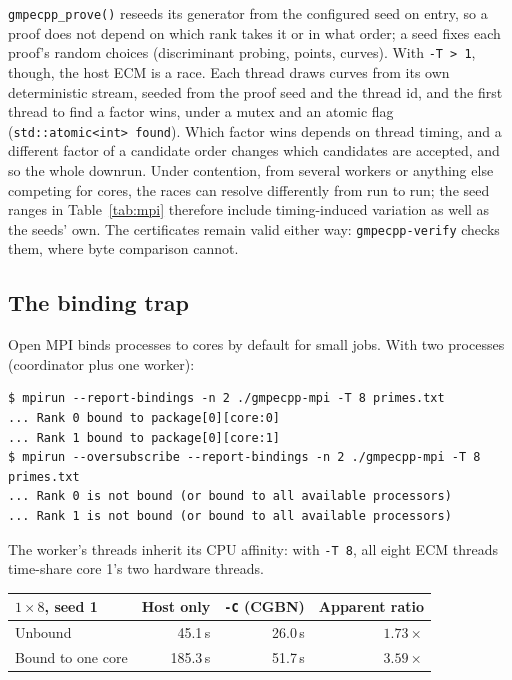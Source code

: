 \documentclass[11pt,a4paper]{article}
\newcommand{\code}[1]{\texttt{#1}}
\begin{document}
\code{gmpecpp\_prove()} reseeds its generator from the configured seed on
entry, so a proof does not depend on which rank takes it or in what order;
a seed fixes each proof's random choices (discriminant probing, points,
curves). With \code{-T > 1}, though, the host ECM is a race. Each thread
draws curves from its own deterministic stream, seeded from the proof seed
and the thread id, and the first thread to find a factor wins, under a
mutex and an atomic flag (\code{std::atomic<int> found}). Which factor wins
depends on thread timing, and a different factor of a candidate order
changes which candidates are accepted, and so the whole downrun. Under
contention, from several workers or anything else competing for cores, the
races can resolve differently from run to run; the seed ranges in
Table~\ref{tab:mpi} therefore include timing-induced variation as well as
the seeds' own. The certificates remain valid either way:
\code{gmpecpp-verify} checks them, where byte comparison cannot.

\subsection{The binding trap}
\label{sec:binding}

Open MPI binds processes to cores by default for small jobs. With two
processes (coordinator plus one worker):
\begin{lstlisting}
$ mpirun --report-bindings -n 2 ./gmpecpp-mpi -T 8 primes.txt
... Rank 0 bound to package[0][core:0]
... Rank 1 bound to package[0][core:1]
$ mpirun --oversubscribe --report-bindings -n 2 ./gmpecpp-mpi -T 8 primes.txt
... Rank 0 is not bound (or bound to all available processors)
... Rank 1 is not bound (or bound to all available processors)
\end{lstlisting}
The worker's threads inherit its CPU affinity: with \code{-T 8}, all eight
ECM threads time-share core 1's two hardware threads.

\begin{center}
\begin{tabular}{lrrr}
\toprule
$1 \times 8$, seed 1 & Host only & \code{-C} (CGBN) & Apparent ratio \\
\midrule
Unbound           & 45.1\,s  & 26.0\,s & $1.73\times$ \\
Bound to one core & 185.3\,s & 51.7\,s & $3.59\times$ \\
\bottomrule
\end{tabular}
\end{center}
\end{document}
